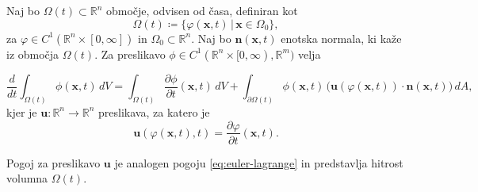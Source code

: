 \documentclass[mat2, tisk]{fmfdelo}
\newcommand{\R}{\mathbb R}
\newcommand{\bd}{\textbf}
\begin{document}
\begin{izrek}
\label{transport}
Naj bo $\Omega(t) \subset \mathbb{R}^n$ območje, odvisen od časa, 
definiran kot 
$$
\Omega(t) \coloneqq \{\varphi(\bd{x}, t) \,|\, \bd{x} \in \Omega_0\},
$$
za $\varphi \in C^1(\R^n \times [0, \infty])$ in $\Omega_0 \subset \R^n$.
Naj bo $\mathbf{n}(\mathbf{x},t)$ enotska normala, ki kaže iz območja $\Omega(t)$.  
Za preslikavo $\phi \in C^1(\R^n \times [0, \infty), \R^m)$ velja

\begin{equation*}
\frac{d}{dt} \int_{\Omega(t)} \phi(\mathbf{x},t)\, dV
= \int_{\Omega(t)} \frac{\partial \phi}{\partial t}(\mathbf{x},t)\, dV
+ \int_{\partial \Omega(t)} \phi(\mathbf{x},t)\, \big(\bd{u}(\varphi(\bd{x}, t))\cdot \mathbf{n}(\mathbf{x},t)\big)\, dA,
\end{equation*}
kjer je $\bd{u}:\R^n \rightarrow \R^n$ preslikava, za katero je 
\begin{equation*}
\bd{u}(\varphi(\bd{x}, t), t) = \frac{\partial \varphi}{\partial t}(\bd{x}, t).
\end{equation*}
\end{izrek}

\begin{opomba}
Pogoj za preslikavo $\bd{u}$ je analogen pogoju \eqref{eq:euler-lagrange} in predstavlja hitrost volumna $\Omega(t)$.
\end{opomba}
\end{document}
